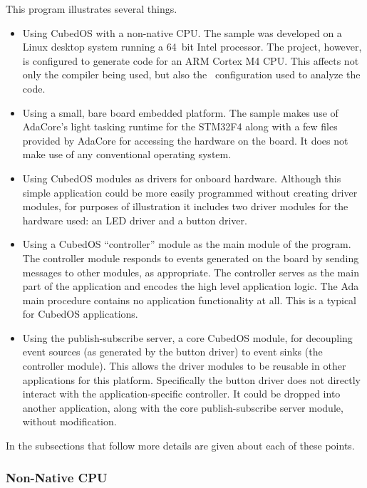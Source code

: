 This program illustrates several things.
\begin{itemize}

  \item Using CubedOS with a non-native CPU. The sample was developed on a Linux desktop system
  running a 64~bit Intel processor. The project, however, is configured to generate code for an
  ARM Cortex M4 CPU. This affects not only the compiler being used, but also the \SPARK\
  configuration used to analyze the code.

  \item Using a small, bare board embedded platform. The sample makes use of AdaCore's light
  tasking runtime for the STM32F4 along with a few files provided by AdaCore for accessing the
  hardware on the board. It does not make use of any conventional operating system.

  \item Using CubedOS modules as drivers for onboard hardware. Although this simple application
  could be more easily programmed without creating driver modules, for purposes of illustration
  it includes two driver modules for the hardware used: an LED driver and a button driver.

  \item Using a CubedOS ``controller'' module as the main module of the program. The controller
  module responds to events generated on the board by sending messages to other modules, as
  appropriate. The controller serves as the main part of the application and encodes the high
  level application logic. The Ada main procedure contains no application functionality at all.
  This is a typical for CubedOS applications.

  \item Using the publish-subscribe server, a core CubedOS module, for decoupling event sources
  (as generated by the button driver) to event sinks (the controller module). This allows the
  driver modules to be reusable in other applications for this platform. Specifically the button
  driver does not directly interact with the application-specific controller. It could be
  dropped into another application, along with the core publish-subscribe server module, without
  modification.

\end{itemize}

In the subsections that follow more details are given about each of these points.

\subsubsection{Non-Native CPU}

